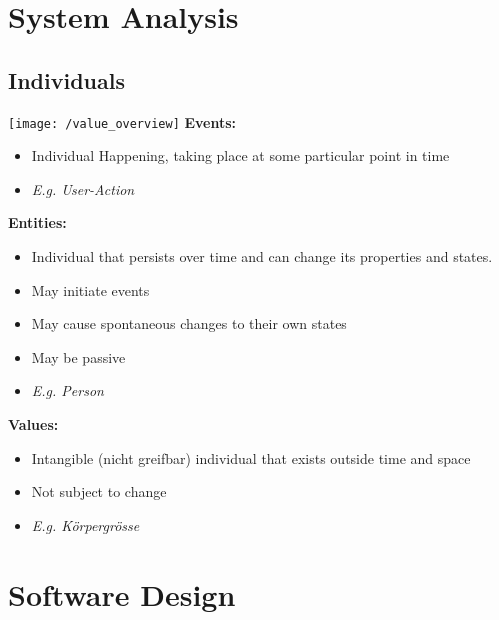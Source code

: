 
\section{System Analysis}
\subsection{Individuals}
\texttt{[image: /value\_overview]}
\textbf{Events:}
\begin{itemize}[topsep=0pt]
    \itemsep -0.4em
    \item Individual Happening, taking place at some particular point in time
    \item \textit{E.g. User-Action}
\end{itemize}
\textbf{Entities:}
\begin{itemize}[topsep=0pt]
    \itemsep -0.4em
    \item Individual that persists over time and can change its properties and states.
    \item May initiate events
    \item May cause spontaneous changes to their own states
    \item May be passive
    \item \textit{E.g. Person}
\end{itemize}
\textbf{Values:}
\begin{itemize}[topsep=0pt]
    \itemsep -0.4em
    \item Intangible (nicht greifbar) individual that exists outside time and space
    \item Not subject to change
    \item \textit{E.g. Körpergrösse}
\end{itemize}

\section{Software Design}
